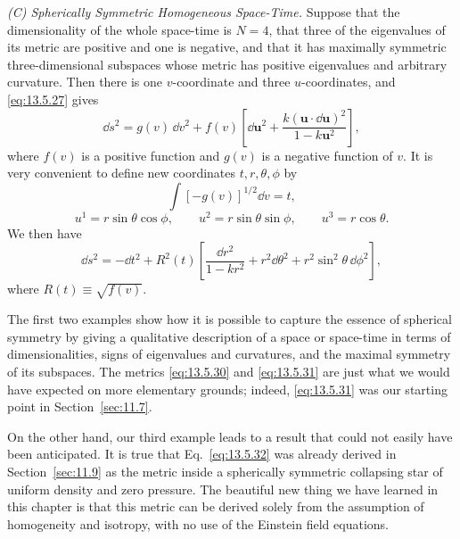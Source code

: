 \medskip
\noindent\emph{(C) Spherically Symmetric Homogeneous Space-Time.}
Suppose that the dimensionality of the whole space-time is \(N=4\), that
three of the eigenvalues of its metric are positive and one is negative, and
that it has maximally symmetric three-dimensional subspaces whose metric has
positive eigenvalues and arbitrary curvature. Then there is one
\(v\)-coordinate and three \(u\)-coordinates, and \eqref{eq:13.5.27} gives
\[
  \dd s^2
  =
  g(v)\,\dd v^2
  +f(v)
  \left[
    \dd\mathbf{u}^2
    +\frac{k(\mathbf{u}\cdot\dd\mathbf{u})^2}
          {1-k\mathbf{u}^2}
  \right],
\]
where \(f(v)\) is a positive function and \(g(v)\) is a negative function
of \(v\). It is very convenient to define new coordinates
\(t,r,\theta,\phi\) by
\[
  \int\!\left[-g(v)\right]^{1/2}\dd v=t,
\]
\[
  u^1=r\sin\theta\cos\phi,
  \qquad
  u^2=r\sin\theta\sin\phi,
  \qquad
  u^3=r\cos\theta.
\]
We then have
\begin{equation}
  \dd s^2
  =
  -\dd t^2
  +R^2(t)
  \left[
    \frac{\dd r^2}{1-kr^2}
    +r^2\dd\theta^2
    +r^2\sin^2\theta\,\dd\phi^2
  \right],
  \tag{13.5.32}\label{eq:13.5.32}
\end{equation}
where \(R(t)\equiv\sqrt{f(v)}\).

The first two examples show how it is possible to capture the essence of
spherical symmetry by giving a qualitative description of a space or
space-time in terms of dimensionalities, signs of eigenvalues and
curvatures, and the maximal symmetry of its subspaces. The metrics
\eqref{eq:13.5.30} and \eqref{eq:13.5.31} are just what we would have
expected on more elementary grounds; indeed, \eqref{eq:13.5.31} was our
starting point in Section~\ref{sec:11.7}.

On the other hand, our third example leads to a result that could not easily
have been anticipated. It is true that Eq.~\eqref{eq:13.5.32} was already
derived in Section~\ref{sec:11.9} as the metric inside a spherically
symmetric collapsing star of uniform density and zero pressure. The
beautiful new thing we have learned in this chapter is that this metric can
be derived solely from the assumption of homogeneity and isotropy, with no
use of the Einstein field equations.
